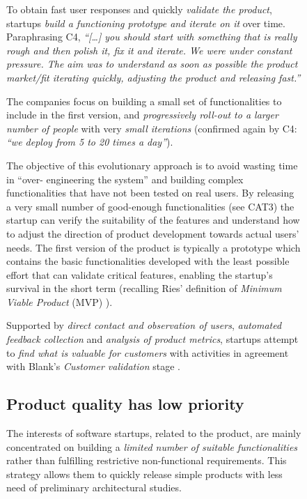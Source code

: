 \documentclass[12pt,journal,compsoc]{../sty/IEEEtran}
\begin{document}
\begin{table}[!t]
\begin{figure}[!t]
To obtain fast user responses and quickly \textit{validate the product},
startups \textit{build a functioning prototype and iterate on it} over time.
Paraphrasing C4, \textit{``[\ldots] you should start with something that is
really rough and then polish it, fix it and iterate. We were under constant
pressure. The aim was to understand as soon as possible the product market/fit
iterating quickly, adjusting the product and releasing fast.''}

The companies focus on building a small set of functionalities to include in
the first version, and \textit{progressively roll-out to a larger number of
people} with very \textit{small iterations} (confirmed again by C4: \textit{``we
deploy from 5 to 20 times a day''}).

The objective of this evolutionary approach is to avoid wasting time in  ``over-
engineering the system'' and building complex functionalities that have  not
been tested on real users. By releasing a very small number of good-enough
functionalities (see CAT3) the startup can verify the suitability of the
features and understand how to adjust the direction of product development
towards actual users' needs. The first version of the product is typically a
prototype which contains the basic functionalities developed with the least
possible effort that can validate critical features, enabling the startup's
survival in the short term (recalling  Ries' definition of \textit{Minimum
Viable Product} (MVP) \cite{Ries2011}).

Supported by \textit{direct contact and observation of users},
\textit{automated feedback collection} and \textit{analysis of product metrics},
startups attempt to \textit{find what is valuable for customers} with activities
in agreement with Blank's \textit{Customer validation} stage \cite{Blank2005}.

\subsection{Product quality has low priority} \label{res:gsm:cat3} The interests
of software startups, related to the product, are mainly  concentrated on
building a  \textit{limited number of suitable functionalities}  rather than
fulfilling restrictive non-functional requirements. This strategy  allows them
to quickly release simple products with less need of preliminary  architectural
studies.



\end{figure}
\end{table}
\end{document}
